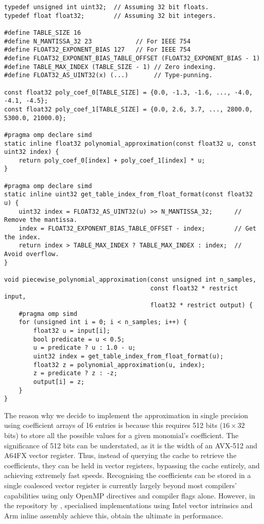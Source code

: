 \documentclass[manuscript,review]{acmart}
\begin{document}
\begin{lstfloat}[h!tb]
\begin{lstlisting}[style=C, caption={C implementation of the piecewise linear approximation.}, label={code:piecewise_linear_approximation}]
typedef unsigned int uint32;  // Assuming 32 bit floats. 
typedef float float32;        // Assuming 32 bit integers. 

#define TABLE_SIZE 16
#define N_MANTISSA_32 23            // For IEEE 754
#define FLOAT32_EXPONENT_BIAS 127   // For IEEE 754
#define FLOAT32_EXPONENT_BIAS_TABLE_OFFSET (FLOAT32_EXPONENT_BIAS - 1)
#define TABLE_MAX_INDEX (TABLE_SIZE - 1) // Zero indexing.
#define FLOAT32_AS_UINT32(x) (...)       // Type-punning.

const float32 poly_coef_0[TABLE_SIZE] = {0.0, -1.3, -1.6, ..., -4.0, -4.1, -4.5};
const float32 poly_coef_1[TABLE_SIZE] = {0.0, 2.6, 3.7, ..., 2800.0, 5300.0, 21000.0};

#pragma omp declare simd
static inline float32 polynomial_approximation(const float32 u, const uint32 index) {
    return poly_coef_0[index] + poly_coef_1[index] * u;
}

#pragma omp declare simd
static inline uint32 get_table_index_from_float_format(const float32 u) {
    uint32 index = FLOAT32_AS_UINT32(u) >> N_MANTISSA_32;      // Remove the mantissa.
    index = FLOAT32_EXPONENT_BIAS_TABLE_OFFSET - index;        // Get the index.
    return index > TABLE_MAX_INDEX ? TABLE_MAX_INDEX : index;  // Avoid overflow.
}

void piecewise_polynomial_approximation(const unsigned int n_samples,
                                        const float32 * restrict input, 
                                        float32 * restrict output) {
    #pragma omp simd 
    for (unsigned int i = 0; i < n_samples; i++) {
        float32 u = input[i];
        bool predicate = u < 0.5;
        u = predicate ? u : 1.0 - u;
        uint32 index = get_table_index_from_float_format(u);
        float32 z = polynomial_approximation(u, index);
        z = predicate ? z : -z;
        output[i] = z;
    }
}
\end{lstlisting}
\end{lstfloat}

The reason why we decide to implement the approximation in single precision using coefficient arrays of 16 entries is because this requires 512 bits ($ 16 \times 32 $ bits) to store all the possible values for a given monomial's coefficient. The significance of 512 bits can be understated, as it is the width of an AVX-512 and A64FX vector register. Thus, instead of querying the cache to retrieve the coefficients, they can be held in vector registers, bypassing the cache entirely, and achieving extremely fast speeds. Recognising the coefficients can be stored in a single coalesced vector register is currently largely beyond most compilers' capabilities using only OpenMP directives and compiler flags alone. However, in the repository by \citet{sheridan2020approximate_random}, specialised implementations using Intel vector intrinsics and Arm inline assembly achieve this, obtain the ultimate in performance. 
\end{document}
